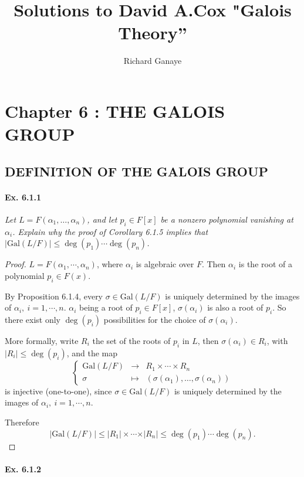 \documentclass[11pt,a4paper]{article}
\title{Solutions to David A.Cox  "Galois Theory''}
\author{Richard Ganaye}
\newcommand{\Gal}{\mathrm{Gal}}
\begin{document}
\section{Chapter 6 : THE GALOIS GROUP}

\subsection{DEFINITION OF THE GALOIS GROUP}

\paragraph{Ex. 6.1.1}

{\it Let $L = F(\alpha_1,\ldots,\alpha_n)$, and let $p_i \in F[x]$ be a nonzero polynomial vanishing at $\alpha_i$. Explain why the proof of Corollary 6.1.5 implies that $|\Gal(L/F)| \leq \deg(p_1)\cdots\deg(p_n)$.
}

\begin{proof}
$L=F(\alpha_1,\cdots,\alpha_n)$, where $\alpha_i$ is algebraic over $F$. Then $\alpha_i$ is the root of a polynomial $p_i \in F(x)$.

By Proposition 6.1.4, every $\sigma \in \mathrm{Gal}(L/F)$ is uniquely determined by the images of $\alpha_i,\  i=1,\cdots,n$. $\alpha_i$ being a root of $p_i \in F[x]$, $\sigma(\alpha_i)$ is also a root of $p_i$. So there exist only $\deg(p_i)$ possibilities for the choice of $\sigma(\alpha_i)$.

More formally, write $R_i$ the set of the roots of  $p_i$ in $L$, then $\sigma(\alpha_i) \in R_i$, with $\vert R_i \vert \leq \deg(p_i)$, and the map
$$
\left\{
\begin{array}{ccc}
 \mathrm{Gal}(L/F) & \to  &  R_1\times \cdots \times R_n\\
\sigma  & \mapsto  &   (\sigma(\alpha_1), \ldots,\sigma(\alpha_n))
\end{array}
\right.
$$
is injective (one-to-one), since $\sigma \in \mathrm{Gal}(L/F)$ is uniquely determined by the images of $\alpha_i,\ i=1,\cdots,n$.

Therefore $$\vert \mathrm{Gal}(L/F) \vert \leq \vert R_1 \vert \times \cdots  \times \vert R_n\vert \leq \deg(p_1)\cdots \deg(p_n). $$
\end{proof}

\paragraph{Ex. 6.1.2}
\end{document}

